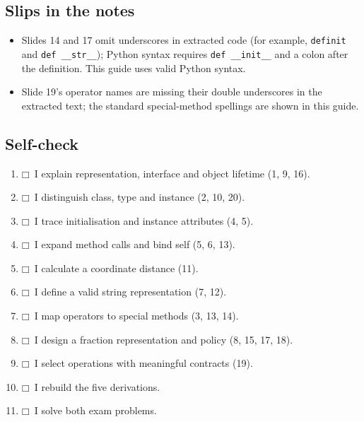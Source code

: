 \documentclass[11pt]{article}
\begin{document}
\begin{keepsection}
\section{Slips in the notes}

\begin{itemize}
\item Slides 14 and 17 omit underscores in extracted code (for example, \texttt{definit} and \texttt{def \_\_str\_\_}); Python syntax requires \texttt{def \_\_init\_\_} and a colon after the definition. This guide uses valid Python syntax.
\item Slide 19’s operator names are missing their double underscores in the extracted text; the standard special-method spellings are shown in this guide.
\end{itemize}
\end{keepsection}

\begin{keepsection}
\section{Self-check}

\begin{enumerate}
\item $\mdlgwhtsquare$\  I explain representation, interface and object lifetime (1, 9, 16).
\item $\mdlgwhtsquare$\  I distinguish class, type and instance (2, 10, 20).
\item $\mdlgwhtsquare$\  I trace initialisation and instance attributes (4, 5).
\item $\mdlgwhtsquare$\  I expand method calls and bind self (5, 6, 13).
\item $\mdlgwhtsquare$\  I calculate a coordinate distance (11).
\item $\mdlgwhtsquare$\  I define a valid string representation (7, 12).
\item $\mdlgwhtsquare$\  I map operators to special methods (3, 13, 14).
\item $\mdlgwhtsquare$\  I design a fraction representation and policy (8, 15, 17, 18).
\item $\mdlgwhtsquare$\  I select operations with meaningful contracts (19).
\item $\mdlgwhtsquare$\  I rebuild the five derivations.
\item $\mdlgwhtsquare$\  I solve both exam problems.
\end{enumerate}
\end{keepsection}
\end{document}
